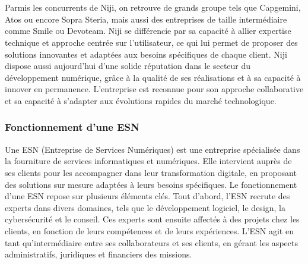 \documentclass[12pt]{article}
\begin{document}
\\\\
Parmis les concurrents de Niji, on retrouve de grands groupe tels que Capgemini, Atos ou encore Sopra Steria, mais aussi des entreprises de taille intermédiaire comme Smile ou Devoteam. Niji se différencie par sa capacité à allier expertise technique et approche centrée sur l'utilisateur, ce qui lui permet de proposer des solutions innovantes et adaptées aux besoins spécifiques de chaque client. Niji dispose aussi aujourd'hui d'une solide réputation dans le secteur du développement numérique, grâce à la qualité de ses réalisations et à sa capacité à innover en permanence. L'entreprise est reconnue pour son approche collaborative et sa capacité à s'adapter aux évolutions rapides du marché technologique.
\subsubsection{Fonctionnement d'une ESN}
Une ESN (Entreprise de Services Numériques) est une entreprise spécialisée dans la fourniture de services informatiques et numériques. Elle intervient auprès de ses clients pour les accompagner dans leur transformation digitale, en proposant des solutions sur mesure adaptées à leurs besoins spécifiques. Le fonctionnement d'une ESN repose sur plusieurs éléments clés.
Tout d'abord, l'ESN recrute des experts dans divers domaines, tels que le développement logiciel, le design, la cybersécurité et le conseil. Ces experts sont ensuite affectés à des projets chez les clients, en fonction de leurs compétences et de leurs expériences. L'ESN agit en tant qu'intermédiaire entre ses collaborateurs et ses clients, en gérant les aspects administratifs, juridiques et financiers des missions.
\newpage
\end{document}
